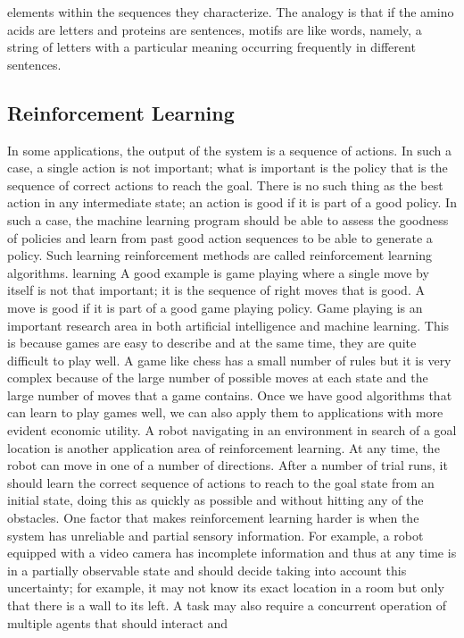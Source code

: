 elements within the sequences they characterize. The analogy is that if the amino acids are letters and proteins are sentences, motifs are like words, namely, a string of letters with a particular meaning occurring frequently in different sentences.

\subsection{Reinforcement Learning}

In some applications, the output of the system is a sequence of actions. In such a case, a single action is not important; what is important is the policy that is the sequence of correct actions to reach the goal. There is no such thing as the best action in any intermediate state; an action is good if it is part of a good policy. In such a case, the machine learning program should be able to assess the goodness of policies and learn from past good action sequences to be able to generate a policy. Such learning reinforcement methods are called reinforcement learning algorithms. learning A good example is game playing where a single move by itself is not that important; it is the sequence of right moves that is good. A move is good if it is part of a good game playing policy. Game playing is an important research area in both artificial intelligence and machine learning. This is because games are easy to describe and at the same time, they are quite difficult to play well. A game like chess has a small number of rules but it is very complex because of the large number of possible moves at each state and the large number of moves that a game contains. Once we have good algorithms that can learn to play games well, we can also apply them to applications with more evident economic utility. A robot navigating in an environment in search of a goal location is another application area of reinforcement learning. At any time, the robot can move in one of a number of directions. After a number of trial runs, it should learn the correct sequence of actions to reach to the goal state from an initial state, doing this as quickly as possible and without hitting any of the obstacles. One factor that makes reinforcement learning harder is when the system has unreliable and partial sensory information. For example, a robot equipped with a video camera has incomplete information and thus at any time is in a partially observable state and should decide taking into account this uncertainty; for example, it may not know its exact location in a room but only that there is a wall to its left. A task may also require a concurrent operation of multiple agents that should interact and

